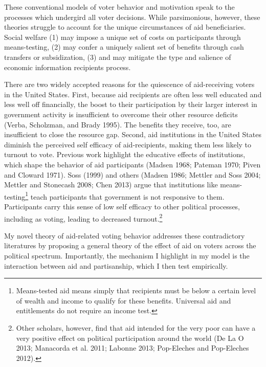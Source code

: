 \documentclass[12pt]{paper}
\begin{document}
These conventional models of voter behavior and motivation speak to the processes which undergird all voter decisions. While parsimonious, however, these theories struggle to account for the unique circumstances of aid beneficiaries. Social welfare (1) may impose a unique set of costs on participants through means-testing, (2) may confer a uniquely salient set of benefits through cash transfers or subsidization, (3) and may mitigate the type and salience of economic information recipients process.

There are two widely accepted reasons for the quiescence of aid-receiving voters in the United States. First, because aid recipients are often less well educated and less well off financially, the boost to their participation by their larger interest in government activity is insufficient to overcome their other resource deficits (Verba, Scholzman, and Brady 1995). The benefits they receive, too, are insufficient to close the resource gap. Second, aid institutions in the United States diminish the perceived self efficacy of aid-recipients, making them less likely to turnout to vote. Previous work highlight the educative effects of institutions, which shape the behavior of aid participants (Madsen 1968; Pateman 1970; Piven and Cloward 1971). Soss (1999) and others (Madsen 1986; Mettler and Soss 2004; Mettler and Stonecash 2008; Chen 2013) argue that institutions like means-testing\footnote{Means-tested aid means simply that recipients must be below a certain level of wealth and income to qualify for these benefits. Universal aid and entitlements do not require an income test.} teach participants that government is not responsive to them. Participants carry this sense of low self efficacy to other political processes, including as voting, leading to decreased turnout.\footnote{Other scholars, however, find that aid intended for the very poor can have a very positive effect on political participation around the world (De La O 2013; Manacorda et al. 2011; Labonne 2013; Pop-Eleches and Pop-Eleches 2012).} 

My novel theory of aid-related voting behavior addresses these contradictory literatures by proposing a general theory of the effect of aid on voters across the political spectrum. Importantly, the mechanism I highlight in my model is the interaction between aid and partisanship, which I then test empirically.
\end{document}
